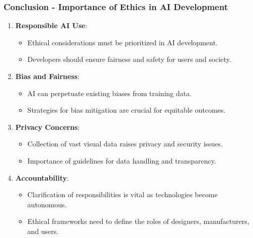 \documentclass[aspectratio=169]{beamer}
\begin{document}
\begin{frame}[fragile]
    \frametitle{Conclusion - Importance of Ethics in AI Development}

    \begin{enumerate}
        \item \textbf{Responsible AI Use}:
        \begin{itemize}
            \item Ethical considerations must be prioritized in AI development.
            \item Developers should ensure fairness and safety for users and society.
        \end{itemize}

        \item \textbf{Bias and Fairness}:
        \begin{itemize}
            \item AI can perpetuate existing biases from training data.
            \item Strategies for bias mitigation are crucial for equitable outcomes.
        \end{itemize}

        \item \textbf{Privacy Concerns}:
        \begin{itemize}
            \item Collection of vast visual data raises privacy and security issues.
            \item Importance of guidelines for data handling and transparency.
        \end{itemize}

        \item \textbf{Accountability}:
        \begin{itemize}
            \item Clarification of responsibilities is vital as technologies become autonomous.
            \item Ethical frameworks need to define the roles of designers, manufacturers, and users.
        \end{itemize}
    \end{enumerate}
\end{frame}
\end{document}
